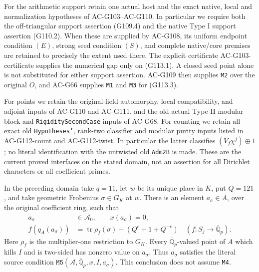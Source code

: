 For the arithmetic support retain one actual host and the exact
native, local and normalization hypotheses of AC-G103--AC-G110.
In particular we require both the off-triangular support assertion
(G109.4) and the native Type I support assertion (G110.2).
When these are supplied by AC-G108, its uniform endpoint condition
\((E)\), strong seed condition \((S)\), and complete native/core
premises are retained to precisely the extent used there.  The
explicit certificate AC-G103-certificate supplies the numerical gap
only on (G113.1).  A closed seed point alone is not substituted for
either support assertion.  AC-G109 then supplies \texttt{M2} over
the original \(O\), and AC-G66 supplies \texttt{M1} and
\texttt{M3} for (G113.3).

For points we retain the original-field automorphy, local
compatibility, and adjoint inputs of AC-G110 and AC-G111, and the
old actual Type II modular block and \texttt{RigiditySecondCase}
inputs of AC-G68.  For counting we retain all exact old
\texttt{Hypotheses'}, rank-two classifier and modular purity inputs
listed in AC-G112-count and AC-G112-twist.  In particular the latter
classifies \((V_f\chi^j)\oplus1\); no literal identification with
the untwisted old \texttt{Adm2B} is made.  These are the current
proved interfaces on the stated domain, not an assertion for all
Dirichlet characters or all coefficient primes.

\begin{theorem}
\label{thm:G113-M5}
In the preceding domain take \(q=11\), let \(w\) be its unique
place in \(K\), put \(Q=121\), and take geometric Frobenius
\(\sigma\in G_K\) at \(w\).  There is an element
\(a_\sigma\in A\), over the original coefficient ring, such that
\[
 \begin{split}
 a_\sigma&\in\mathcal A_0,\qquad x(a_\sigma)=0,\\
 f(q_A(a_\sigma))
   &=\operatorname{tr}\rho_f(\sigma)
                -(Q^e+1+Q^{-e})
       \quad(f:S_j\to\overline{\mathbb Q}_p).
 \end{split}
 \tag{G113.5}
\]
Here \(\rho_f\) is the multiplier-one restriction to \(G_K\).
Every \(\overline{\mathbb Q}_p\)-valued point of \(A\) which
kills \(I\) and is two-sided has nonzero value on \(a_\sigma\).
Thus \(a_\sigma\) satisfies the literal source condition
\(\texttt{M5}(\mathcal A,\overline{\mathbb Q}_p,x,I,a_\sigma)\).
This conclusion does not assume \texttt{M4}.
\end{theorem}

